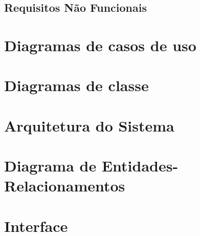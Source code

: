 \subsection{Requisitos Não Funcionais}



\section{Diagramas de casos de uso} \label{sec:modelagem:casos}
\section{Diagramas de classe} \label{sec:modelagem:classe}
\section{Arquitetura do Sistema} \label{sec:modelagem:arquitetura}
\section{Diagrama de Entidades-Relacionamentos} \label{sec:modelagem:der}
\section{Interface} \label{sec:modelagem:interface}